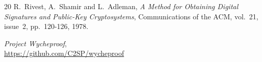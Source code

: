 \documentclass{llncs}
\begin{document}
\begin{thebibliography}{20}
R.~Rivest, A.~Shamir and L.~Adleman,
\emph{A Method for Obtaining Digital Signatures and Public-Key Cryptosystems},
Communications of the ACM, vol.~21, issue~2, pp.~120-126, 1978.













\emph{Project Wycheproof},\\
\url{https://github.com/C2SP/wycheproof}

\end{thebibliography}

\end{document}
